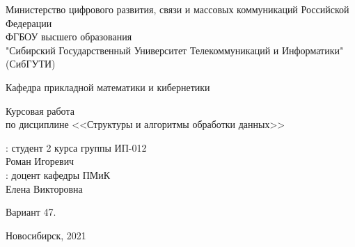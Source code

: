 \documentclass[fleqn]{article}
\begin{document}
\begin{titlepage}
\newpage
\begin{center}
Министерство цифрового развития, связи и массовых коммуникаций Российской Федерации\\
ФГБОУ высшего образования \\
"Сибирский Государственный Университет Телекоммуникаций и Информатики" (СибГУТИ)

Кафедра прикладной математики и кибернетики
\end{center}
\vspace{9em}
\begin{center}
Курсовая работа \\
по дисциплине <<Структуры и алгоритмы обработки данных>>
\end{center}


\vspace{15em}

\begin{center}
: студент 2 курса группы ИП-012 \\
 Роман Игоревич \\
: доцент кафедры ПМиК \\ 
 Елена Викторовна
\end{center}

\vfill

\begin{center}
Вариант 47.
\end{center}

\vspace{3em}

\begin{center}
Новосибирск, 2021
\end{center}
\end{titlepage}


\end{document}
